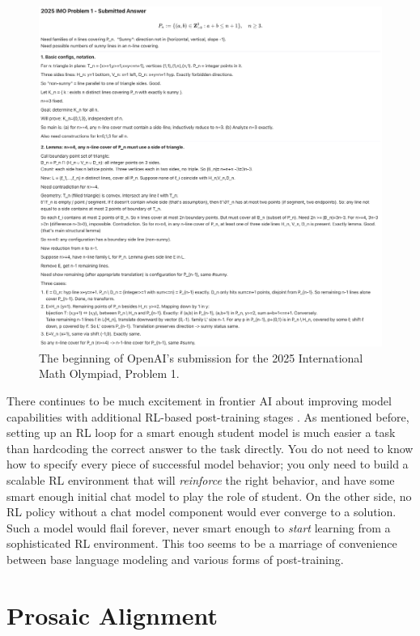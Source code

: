\begin{figure}[ht]
\centering
\includegraphics[scale=.19]{./images/IMO_Gold.png}
\caption[From Alexander Wei, OpenAI. Complete answer transcripts are available
    in \cite{wei2025imo}]{ The beginning of OpenAI's submission for the 2025
    International Math Olympiad, Problem 1. }
\label{imoGold}
\end{figure}

There continues to be much excitement in frontier AI about improving model
capabilities with additional RL-based post-training stages
\cite{silver2025experience}. As mentioned before, setting up an RL loop for a
smart enough student model is much easier a task than hardcoding the correct
answer to the task directly. You do not need to know how to specify every piece
of successful model behavior; you only need to build a scalable RL environment
that will \emph{reinforce} the right behavior, and have some smart enough
initial chat model to play the role of student. On the other side, no RL policy
without a chat model component would ever converge to a solution. Such a model
would flail forever, never smart enough to \emph{start} learning from a
sophisticated RL environment. This too seems to be a marriage of convenience
between base language modeling and various forms of post-training.

\section{Prosaic Alignment}

